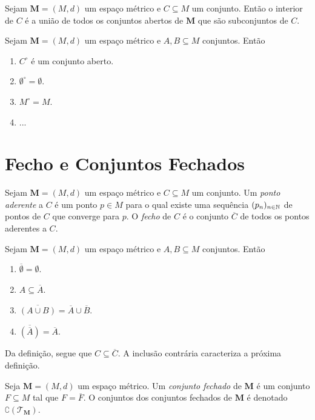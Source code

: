\begin{prop}
	Sejam $\bm M = (M,d)$ um espaço métrico e $C \subseteq M$ um conjunto. Então o interior de $C$ é a união de todos os conjuntos abertos de $\bm M$ que são subconjuntos de $C$.
\end{prop}

\begin{prop}
	Sejam $\bm M = (M,d)$ um espaço métrico e $A,B \subseteq M$ conjuntos. Então
	\begin{enumerate}
	\item $C^\circ$ é um conjunto aberto.
	\item $\emptyset^\circ = \emptyset$.
	\item $M^\circ = M$.
	\item ...
	\end{enumerate}
\end{prop}

\section{Fecho e Conjuntos Fechados}

\begin{defi}
	Sejam $\bm M = (M,d)$ um espaço métrico e $C \subseteq M$ um conjunto. Um \emph{ponto aderente} a $C$ é um ponto $p \in M$ para o qual existe uma sequência $(p_n)_{n \in \mathbb{N}}$ de pontos de $C$ que converge para $p$. O \emph{fecho} de $C$ é o conjunto $\overline C$ de todos os pontos aderentes a $C$.
\end{defi}

\begin{prop}
	Sejam $\bm M = (M,d)$ um espaço métrico e $A,B \subseteq M$ conjuntos. Então
	\begin{enumerate}
	\item $\overline \emptyset = \emptyset$.
	\item $A \subseteq \overline A$.
	\item $\overline{(A \cup B)} = \overline A \cup \overline B$.
	\item $\overline{(\overline A)} = \overline A$.
	\end{enumerate}
\end{prop}

Da definição, segue que $C \subseteq \overline C$. A inclusão contrária caracteriza a próxima definição.

\begin{defi}
	Seja $\bm M = (M,d)$ um espaço métrico. Um \emph{conjunto fechado} de $\bm M$ é um conjunto $F \subseteq M$ tal que $F = \overline F$. O conjuntos dos conjuntos fechados de $\bm M$ é denotado $\complement( \mathcal T_{\bm M})$.
\end{defi}

